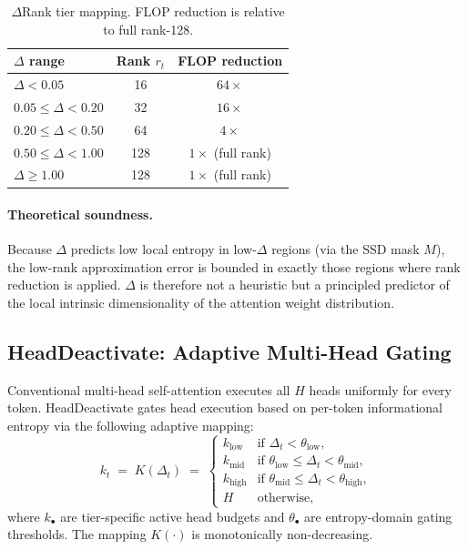 \documentclass[11pt]{article}
\newcommand{\dsig}{\Delta}
\begin{document}
\begin{table}[H]
\centering
\small
\caption{$\dsig$Rank tier mapping. FLOP reduction is relative to full rank-128.}
\label{tab:drank}
\begin{tabular}{lcc}
\toprule
$\dsig$ range & Rank $r_t$ & FLOP reduction \\
\midrule
$\dsig < 0.05$          & 16  & $64\!\times$   \\
$0.05 \le \dsig < 0.20$ & 32  & $16\!\times$   \\
$0.20 \le \dsig < 0.50$ & 64  & $4\!\times$    \\
$0.50 \le \dsig < 1.00$ & 128 & $1\!\times$ (full rank) \\
$\dsig \ge 1.00$        & 128 & $1\!\times$ (full rank) \\
\bottomrule
\end{tabular}
\end{table}

\paragraph{Theoretical soundness.} Because $\dsig$ predicts low local
entropy in low-$\dsig$ regions (via the SSD mask $M$), the low-rank
approximation error is bounded in exactly those regions where rank reduction
is applied. $\dsig$ is therefore not a heuristic but a principled predictor
of the local intrinsic dimensionality of the attention weight distribution.

\subsection{HeadDeactivate: Adaptive Multi-Head Gating}
Conventional multi-head self-attention executes all $H$ heads uniformly for
every token. HeadDeactivate gates head execution based on per-token
informational entropy via the following adaptive mapping:
\begin{equation}\label{eq:headdeact}
  k_t \;=\; K(\dsig_t) \;=\;
  \begin{cases}
    k_{\mathrm{low}}  & \text{if } \dsig_t < \theta_{\mathrm{low}}, \\
    k_{\mathrm{mid}}  & \text{if } \theta_{\mathrm{low}} \le \dsig_t < \theta_{\mathrm{mid}}, \\
    k_{\mathrm{high}} & \text{if } \theta_{\mathrm{mid}} \le \dsig_t < \theta_{\mathrm{high}}, \\
    H                 & \text{otherwise},
  \end{cases}
\end{equation}
where $k_\bullet$ are tier-specific active head budgets and $\theta_\bullet$
are entropy-domain gating thresholds. The mapping $K(\cdot)$ is monotonically
non-decreasing.
\end{document}
